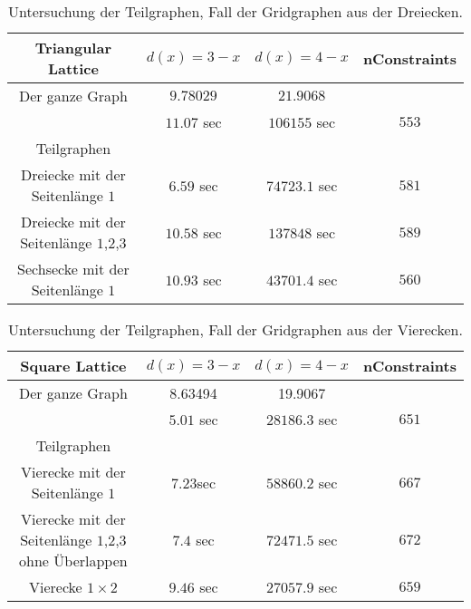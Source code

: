 \documentclass[
	fontsize=12pt,
	paper=a4,
	twoside=false,
	numbers=noenddot,
	plainheadsepline,
	toc=listof,
	toc=bibliography
]{scrartcl}
\begin{document}
	\begin{table}[htbp]
	\centering
	\begin{tabular}{|c|c|c|c|}
		\hline Triangular Lattice& $d(x)=3-x$  & $d(x)=4-x$ & nConstraints\\ \hline 
		Der ganze Graph&  $9.78029$	& $21.9068$ &\\ 
			& $11.07$ sec	&  $106155$ sec & $553$\\ \hline
		Teilgraphen & & &\\\hline
		Dreiecke mit der Seitenlänge $1$& $6.59$ sec	& $74723.1$ sec & $581$\\ \hline
		Dreiecke mit der Seitenlänge $1$,$2$,$3$&  $10.58$ sec	& $137848$ sec & $589$\\ \hline
		Sechsecke mit der Seitenlänge $1$ & $10.93$  sec & $43701.4$ sec & $560$ \\ \hline
	\end{tabular}
	\caption{Untersuchung der Teilgraphen, Fall der Gridgraphen aus der Dreiecken.}
	\label{Table:TG2}
	\end{table}
	
	
	\begin{table}[htbp]
	\centering
	\begin{tabular}{|c|c|c|c|}
	\hline Square Lattice& $d(x)=3-x$  & $d(x)=4-x$ & nConstraints\\ \hline 
		Der ganze Graph	&  8.63494	& 19.9067 & \\ 
			& $5.01$ sec	& $28186.3$ sec & $651$\\ \hline
		Teilgraphen & & &\\ \hline
		Vierecke mit der Seitenlänge $1$&  $7.23$sec	&  $58860.2$ sec & $667$\\ \hline
		Vierecke mit der Seitenlänge $1$,$2$,$3$ ohne Überlappen&  $7.4$ sec & $72471.5$ sec & $672$\\ \hline
		Vierecke $1\times 2$ & $9.46$ sec& $27057.9$ sec & $659$\\ \hline
	\end{tabular}
	\caption{Untersuchung der Teilgraphen, Fall der Gridgraphen aus der Vierecken.} 
	\label{Table:TG3}
	\end{table}
	
\end{document}
